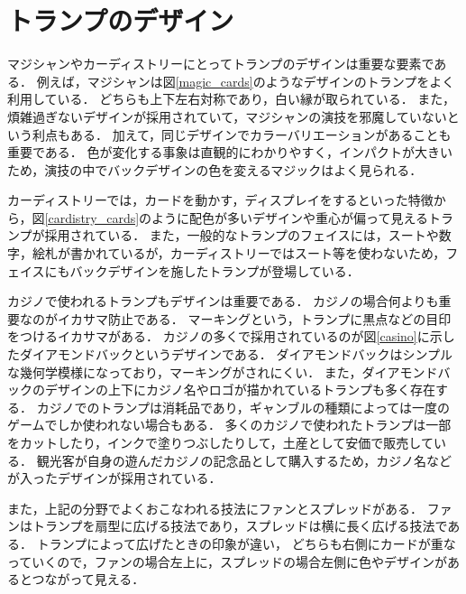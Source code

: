 \chapter{トランプのデザイン}
\label{0201}
マジシャンやカーディストリーにとってトランプのデザインは重要な要素である．
例えば，マジシャンは図\ref{magic_cards}のようなデザインのトランプをよく利用している．
どちらも上下左右対称であり，白い縁が取られている．
また，煩雑過ぎないデザインが採用されていて，マジシャンの演技を邪魔していないという利点もある．
加えて，同じデザインでカラーバリエーションがあることも重要である．
色が変化する事象は直観的にわかりやすく，インパクトが大きいため，演技の中でバックデザインの色を変えるマジックはよく見られる．

カーディストリーでは，カードを動かす，ディスプレイをするといった特徴から，図\ref{cardistry_cards}のように配色が多いデザインや重心が偏って見えるトランプが採用されている．
また，一般的なトランプのフェイスには，スートや数字，絵札が書かれているが，カーディストリーではスート等を使わないため，フェイスにもバックデザインを施したトランプが登場している．

カジノで使われるトランプもデザインは重要である．
カジノの場合何よりも重要なのがイカサマ防止である．
マーキングという，トランプに黒点などの目印をつけるイカサマがある．
カジノの多くで採用されているのが図\ref{casino}に示したダイアモンドバックというデザインである．
ダイアモンドバックはシンプルな幾何学模様になっており，マーキングがされにくい．
また，ダイアモンドバックのデザインの上下にカジノ名やロゴが描かれているトランプも多く存在する．
カジノでのトランプは消耗品であり，ギャンブルの種類によっては一度のゲームでしか使われない場合もある．
多くのカジノで使われたトランプは一部をカットしたり，インクで塗りつぶしたりして，土産として安価で販売している．
観光客が自身の遊んだカジノの記念品として購入するため，カジノ名などが入ったデザインが採用されている．

また，上記の分野でよくおこなわれる技法にファンとスプレッドがある．
ファンはトランプを扇型に広げる技法であり，スプレッドは横に長く広げる技法である．
トランプによって広げたときの印象が違い，
どちらも右側にカードが重なっていくので，ファンの場合左上に，スプレッドの場合左側に色やデザインがあるとつながって見える．



